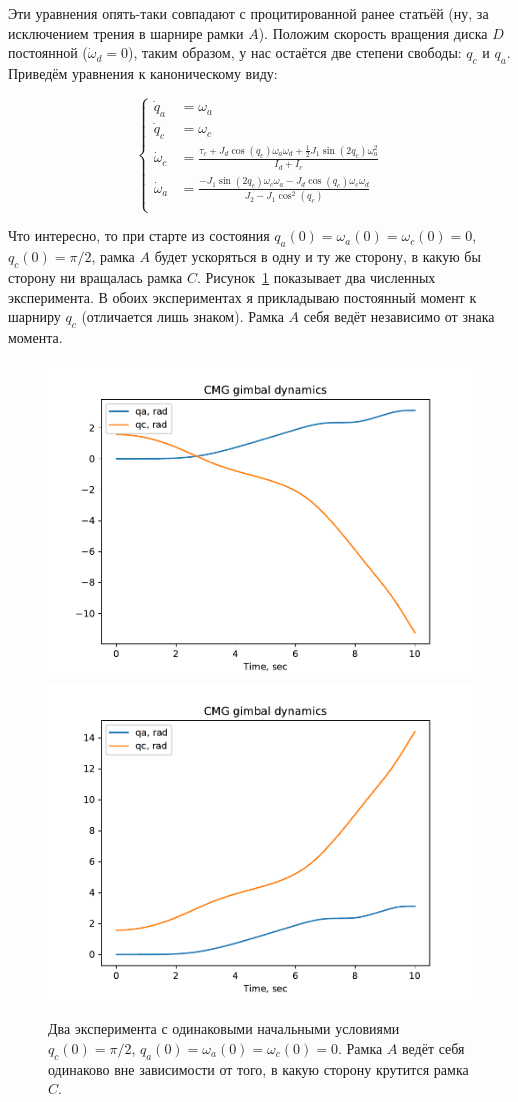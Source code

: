 \documentclass{article}
\begin{document}
Эти уравнения опять-таки совпадают с процитированной ранее статьёй (ну, за исключением трения в шарнире рамки $A$).
Положим скорость вращения диска $D$ постоянной ($\dot\omega_d=0$), таким образом, у нас остаётся две степени свободы: $q_c$ и $q_a$.
Приведём уравнения к каноническому виду:

$$
\left\{\begin{array}{rl}
\dot q_a &= \omega_a \\
\dot q_c &= \omega_c \\
\dot\omega_c &= \frac{\tau_c + J_d \cos(q_c) \omega_a \omega_d + \frac{1}{2}J_1  \sin(2 q_c) \omega_a^2}{I_d+I_c} \\
\dot\omega_a &= \frac{- J_1 \sin(2 q_c)\omega_c\omega_a - J_d \cos(q_c) \omega_c\omega_d}{J_2 - J_1 \cos^2(q_c)} \\
\end{array}\right.
$$

Что интересно, то при старте из состояния $q_a(0)=\omega_a(0)=\omega_c(0)=0$, $q_c(0)=\pi/2$, 
рамка $A$ будет ускоряться в одну и ту же сторону, в какую бы сторону ни вращалась рамка $C$.
Рисунок~\ref{fig:cmg-test} показывает два численных эксперимента.
В обоих экспериментах я прикладываю постоянный момент к шарниру $q_c$ (отличается лишь знаком).
Рамка $A$ себя ведёт независимо от знака момента.

\begin{figure}[!ht]
\centering
\includegraphics[width=.48\linewidth]{Figure_1-14}
\includegraphics[width=.48\linewidth]{Figure_1-15}
\caption{Два эксперимента с одинаковыми начальными условиями $q_c(0)=\pi/2$, $q_a(0)=\omega_a(0)=\omega_c(0)=0$.
Рамка $A$ ведёт себя одинаково вне зависимости от того, в какую сторону крутится рамка $C$.}
\label{fig:cmg-test}
\end{figure}
\end{document}
